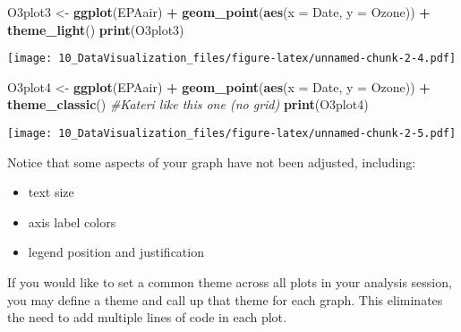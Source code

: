 \documentclass[]{article}
\newenvironment{Shaded}{\begin{snugshade}}{\end{snugshade}}
\newcommand{\KeywordTok}[1]{\textcolor[rgb]{0.13,0.29,0.53}{\textbf{#1}}}
\newcommand{\DataTypeTok}[1]{\textcolor[rgb]{0.13,0.29,0.53}{#1}}
\newcommand{\StringTok}[1]{\textcolor[rgb]{0.31,0.60,0.02}{#1}}
\newcommand{\CommentTok}[1]{\textcolor[rgb]{0.56,0.35,0.01}{\textit{#1}}}
\newcommand{\OperatorTok}[1]{\textcolor[rgb]{0.81,0.36,0.00}{\textbf{#1}}}
\newcommand{\NormalTok}[1]{#1}
\providecommand{\tightlist}{%
  \setlength{\itemsep}{0pt}\setlength{\parskip}{0pt}}
\begin{document}
\begin{Shaded}
\begin{Highlighting}[]
\NormalTok{O3plot3 <-}\StringTok{ }\KeywordTok{ggplot}\NormalTok{(EPAair) }\OperatorTok{+}
\StringTok{  }\KeywordTok{geom_point}\NormalTok{(}\KeywordTok{aes}\NormalTok{(}\DataTypeTok{x =}\NormalTok{ Date, }\DataTypeTok{y =}\NormalTok{ Ozone)) }\OperatorTok{+}
\StringTok{  }\KeywordTok{theme_light}\NormalTok{()}
\KeywordTok{print}\NormalTok{(O3plot3)}
\end{Highlighting}
\end{Shaded}

\texttt{[image: 10\_DataVisualization\_files/figure-latex/unnamed-chunk-2-4.pdf]}

\begin{Shaded}
\begin{Highlighting}[]
\NormalTok{O3plot4 <-}\StringTok{ }\KeywordTok{ggplot}\NormalTok{(EPAair) }\OperatorTok{+}
\StringTok{  }\KeywordTok{geom_point}\NormalTok{(}\KeywordTok{aes}\NormalTok{(}\DataTypeTok{x =}\NormalTok{ Date, }\DataTypeTok{y =}\NormalTok{ Ozone)) }\OperatorTok{+}
\StringTok{  }\KeywordTok{theme_classic}\NormalTok{() }\CommentTok{#Kateri like this one (no grid)}
\KeywordTok{print}\NormalTok{(O3plot4)}
\end{Highlighting}
\end{Shaded}

\texttt{[image: 10\_DataVisualization\_files/figure-latex/unnamed-chunk-2-5.pdf]}

Notice that some aspects of your graph have not been adjusted,
including:

\begin{itemize}
\tightlist
\item
  text size
\item
  axis label colors
\item
  legend position and justification
\end{itemize}

If you would like to set a common theme across all plots in your
analysis session, you may define a theme and call up that theme for each
graph. This eliminates the need to add multiple lines of code in each
plot.
\end{document}
